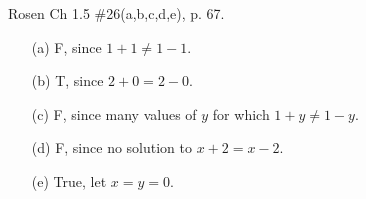\documentclass[12pt,addpoints]{exam}
\begin{document}
\begin{questions}
\question[5] Rosen Ch 1.5 \#26(a,b,c,d,e), p. 67.
    \begin{solution}
    \begin{itemize}
        \item[(a)] F, since $1 + 1 \neq 1 - 1$.
        \item[(b)] T, since $2 + 0 = 2 - 0$.
        \item[(c)] F, since many values of $y$ for which $1 + y \neq 1-y$.
        \item[(d)] F, since no solution to $x + 2 = x - 2$.
        \item[(e)] True, let $x = y = 0$.
    \end{itemize}
    \end{solution}


\end{questions}
\end{document}
